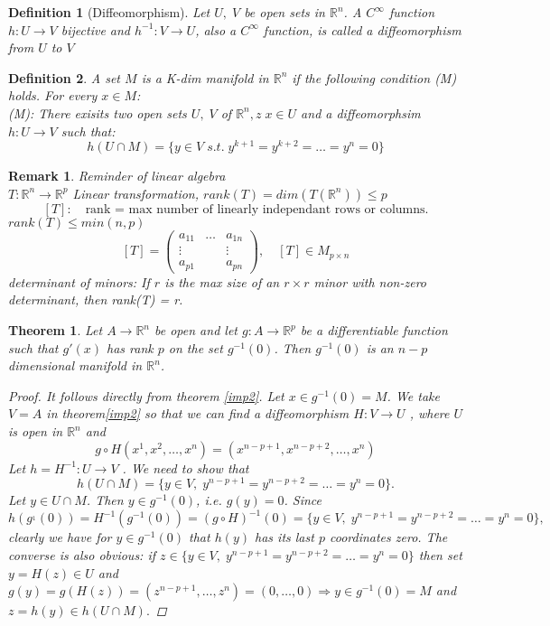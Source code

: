 \documentclass[12pt]{article}
\def\RR{\mathbb{R}}
\newtheorem{theorem}{Theorem}[section]
\newtheorem{definition}{Definition}[section]
\newtheorem*{remark}{Remark}
\begin{document}
\begin{definition}[Diffeomorphism]
Let $U, \; V$ be open sets in $\RR^n$. A $C^{\infty}$ function $h:U\rightarrow V$ bijective and $h^{-1}:V \rightarrow U$, also a $C^{\infty}$ function, is called a diffeomorphism from $U$ to $V$
\end{definition}

\begin{definition}
A set $M$ is a K-dim manifold in $\RR^n$ if the following condition (M) holds. For every $x \in M$:\\
(M): There exisits two open sets $U, \; V$ of $\RR^n, z\; x \in U$ and a diffeomorphsim $h:U \rightarrow V$ such that:
\[ h(U \cap M) = \{ y \in V \; s.t. \;y^{k+1} = y^{k+2} = \dots = y^{n} = 0\} \]
\end{definition}  

\begin{remark} \textmd{Reminder of linear algebra}\\
$T:\RR^n \rightarrow \RR^p$ Linear transformation, $rank(T) = dim(T(\RR^n)) \leq p$\\
\[[T]: \quad \text{rank = max number of linearly independant rows or columns.}\]
$rank(T) \leq min(n,p)$
\[[T] = \begin{pmatrix}
a_{11} & \dots & a_{1n}\\
\vdots & & \vdots\\
a_{p1} & & a_{pn} \end{pmatrix}, \quad [T] \in M_{p \times n} \]
determinant of minors: If $r$ is the max size of an $r \times r$ minor with non-zero determinant, then rank(T) = r.
\end{remark}


\begin{theorem}\label{manifold1}
 Let $A \rightarrow \RR^n$ be open and let $g : A \rightarrow \RR^p$ be a differentiable function such
that $g'(x)$ has rank $p$ on the set $g^{-1}(0)$. Then $g^{-1}(0)$ is an $n\! -\! p$ dimensional manifold in $\RR^n$.
\begin{proof}
 It follows directly from theorem \ref{imp2}. Let $x \in g^{-1}(0) = M$. We take $V = A$ in theorem\ref{imp2} so that we can find a diffeomorphism $H : V \rightarrow U$ , where $U$ is open in $\RR^n$ and 
\[g \circ H(x^1, x^2, \dots, x^n) = (x^{n-p+1}, x^{n-p+2}, \dots , x^n) \]
Let $h = H^{-1} : U \rightarrow V$ . We need to show that 
\[h(U \cap M) = \{y \in V,\; y^{n-p+1} = y^{n-p+2} = \dots = y^n = 0\}.\]
Let $y \in U \cap M$. Then $y \in g^{-1}(0)$, i.e. $g(y) = 0$. Since
\[h(g^{_1}(0)) = H^{-1}(g^{-1}(0)) = (g \circ H)^{-1}(0) = \{y \in V,\; y^{n-p+1} = y^{n-p+2} = \dots = y^n = 0\},\]
clearly we have for $ y \in g^{-1}(0)$ that $ h(y)$ has its last $p$ coordinates zero. The converse is
also obvious: if $z \in \{y \in V,\; y^{n-p+1} = y^{n-p+2} = \dots = y^n = 0\}$ then set $y = H(z) \in U$
and $g(y) = g(H(z)) = (z^{n-p+1},\dots, z^n) = (0,\dots ,0) \Rightarrow y \in g^{-1}(0) = M$ and $z = h(y) \in
h(U \cap M).$
\end{proof}
\end{theorem}
\end{document}
